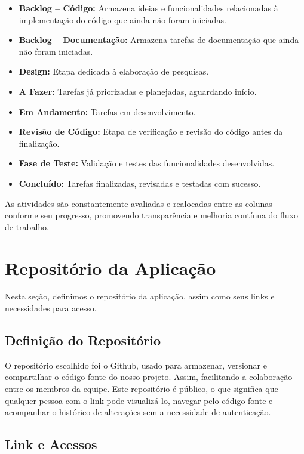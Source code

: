 \documentclass[
	12pt,				%
	openright,			%
	twoside,			%
	a4paper,			%
	english,			%
	french,				%
	spanish,			%
	brazil				%
	]{abntex2}
\begin{document}
\begin{itemize}
    \item \textbf{Backlog – Código:} Armazena ideias e funcionalidades relacionadas à implementação do código que ainda não foram iniciadas.
    \item \textbf{Backlog – Documentação:} Armazena tarefas de documentação que ainda não foram iniciadas.
    \item \textbf{Design:} Etapa dedicada à elaboração de pesquisas.
    \item \textbf{A Fazer:} Tarefas já priorizadas e planejadas, aguardando início.
    \item \textbf{Em Andamento:} Tarefas em desenvolvimento.
    \item \textbf{Revisão de Código:} Etapa de verificação e revisão do código antes da finalização.
    \item \textbf{Fase de Teste:} Validação e testes das funcionalidades desenvolvidas.
    \item \textbf{Concluído:} Tarefas finalizadas, revisadas e testadas com sucesso.
\end{itemize}

As atividades são constantemente avaliadas e realocadas entre as colunas conforme seu progresso, promovendo transparência e melhoria contínua do fluxo de trabalho.

\section{Repositório da Aplicação}

Nesta seção, definimos o repositório da aplicação, assim como seus links e necessidades para acesso.

\subsection{Definição do Repositório}

O repositório escolhido foi o Github, usado para armazenar, versionar e compartilhar o código-fonte do nosso projeto. Assim, facilitando a colaboração entre os membros da equipe. Este repositório é público, o que significa que qualquer pessoa com o link pode visualizá-lo, navegar pelo código-fonte e acompanhar o histórico de alterações sem a necessidade de autenticação.

\subsection{Link e Acessos}
\end{document}
